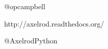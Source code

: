 
\begin{frame}{}

  \begin{description}
    \item [Owen Campbell]
    \item @opcampbell
  \end{description}
  \vfill
  \begin{description}
    \item [Axelrod-Python Project]
    \item http://axelrod.readthedocs.org/
    \item @AxelrodPython
  \end{description}
  \speakernote{
  }
\end{frame}
